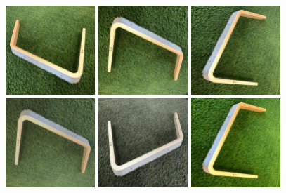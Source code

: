\begin{figure}[hbtp]
\begin{center}
\includegraphics[width = 0.3\textwidth]{./Images/image_15-1.jpg}
\includegraphics[width = 0.3\textwidth]{./Images/image_15-3.jpg}
\includegraphics[width = 0.3\textwidth]{./Images/image_15-4.jpg}
\includegraphics[width = 0.3\textwidth]{./Images/image_15-9.jpg}
\includegraphics[width = 0.3\textwidth]{./Images/image_15-11.jpg}
\includegraphics[width = 0.3\textwidth]{./Images/image_15-12.jpg}

\end{center}
\end{figure}
